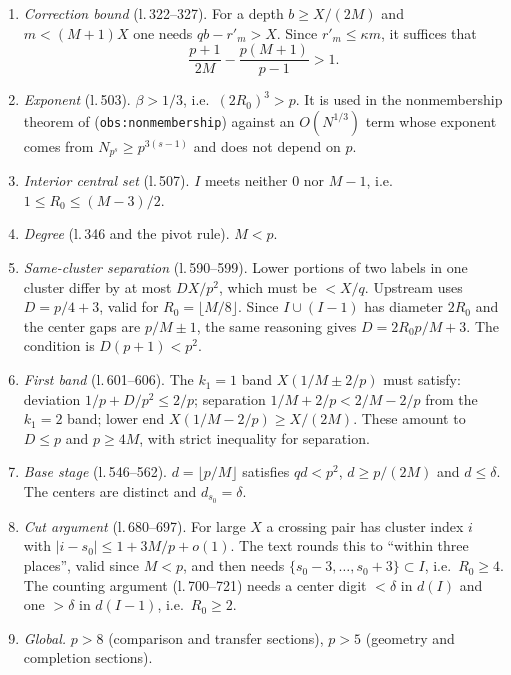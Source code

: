 \documentclass[11pt]{amsart}
\numberwithin{equation}{section}
\theoremstyle{definition}
\theoremstyle{remark}
\newcommand{\up}[1]{\texttt{#1}}
\begin{document}
\begin{enumerate}
\item[(C1)] \emph{Correction bound} (l.\,322--327). For a depth $b\ge
X/(2M)$ and $m<(M+1)X$ one needs $qb-r'_m>X$. Since $r'_m\le\kappa m$,
it suffices that
\begin{equation}\label{eq:C1}
 \frac{p+1}{2M}-\frac{p(M+1)}{p-1}>1.
\end{equation}
\item[(C2)] \emph{Exponent} (l.\,503). $\beta>1/3$, i.e.\ $(2R_0)^3>p$.
It is used in the nonmembership theorem of \cite{OAI-HW2}\linebreak (\up{obs:nonmembership}) against
an $O(N^{1/3})$ term whose exponent comes from $N_{p^s}\ge
p^{3(s-1)}$ and does not depend on $p$.
\item[(C3)] \emph{Interior central set} (l.\,507). $I$ meets neither
$0$ nor $M-1$, i.e.\ $1\le R_0\le(M-3)/2$.
\item[(C4)] \emph{Degree} (l.\,346 and the pivot rule). $M<p$.
\item[(C5)] \emph{Same-cluster separation} (l.\,590--599). Lower
portions of two labels in one cluster differ by at most $D X/p^2$,
which must be $<X/q$. Upstream uses $D=p/4+3$, valid for
$R_0=\lfloor M/8\rfloor$. Since $I\cup(I-1)$ has diameter $2R_0$ and
the center gaps are $p/M\pm1$, the same reasoning gives
$D=2R_0p/M+3$. The condition is $D(p+1)<p^2$.
\item[(C6)] \emph{First band} (l.\,601--606). The $k_1=1$ band
$X(1/M\pm2/p)$ must satisfy: deviation $1/p+D/p^2\le2/p$; separation
$1/M+2/p<2/M-2/p$ from the $k_1=2$ band; lower end
$X(1/M-2/p)\ge X/(2M)$. These amount to $D\le p$ and $p\ge4M$, with
strict inequality for separation.
\item[(C7)] \emph{Base stage} (l.\,546--562). $d=\lfloor p/M\rfloor$
satisfies $qd<p^2$, $d\ge p/(2M)$ and $d\le\delta$. The centers are
distinct and $d_{s_0}=\delta$.
\item[(C8)] \emph{Cut argument} (l.\,680--697). For large $X$ a
crossing pair has cluster index $i$ with $|i-s_0|\le1+3M/p+o(1)$.
The text rounds this to ``within three places'', valid since $M<p$,
and then needs $\{s_0-3,\ldots,s_0+3\}\subset I$, i.e.\ $R_0\ge4$.
The counting argument (l.\,700--721) needs a center digit $<\delta$ in
$d(I)$ and one $>\delta$ in $d(I-1)$, i.e.\ $R_0\ge2$.
\item[(C0)] \emph{Global.} $p>8$ (comparison and transfer sections),
$p>5$ (geometry and completion sections).
\end{enumerate}
\end{document}
